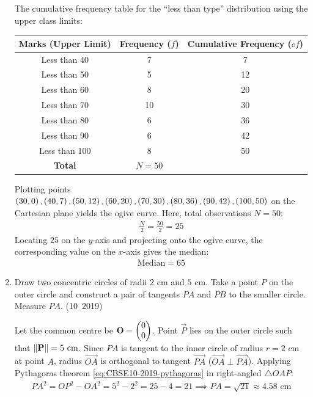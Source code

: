 \begin{enumerate}[label=\thesubsection.\arabic*, ref=\thesubsection.\theenumi]
	\solution
	The cumulative frequency table for the ``less than type'' distribution using the upper class limits:
	\begin{center}
		\begin{tabular}{|c|c|c|}
			\hline
			Marks (Upper Limit) & Frequency ($f$) & Cumulative Frequency ($cf$) \\
			\hline
			Less than 40 & 7 & 7 \\
			Less than 50 & 5 & 12 \\
			Less than 60 & 8 & 20 \\
			Less than 70 & 10 & 30 \\
			Less than 80 & 6 & 36 \\
			Less than 90 & 6 & 42 \\
			Less than 100 & 8 & 50 \\
			\hline
			\textbf{Total} & $N = 50$ & \\
			\hline
		\end{tabular}
	\end{center}
	Plotting points $\brak{30, 0}, \brak{40, 7}, \brak{50, 12}, \brak{60, 20}, \brak{70, 30}, \brak{80, 36}, \brak{90, 42}, \brak{100, 50}$ on the Cartesian plane yields the ogive curve.
	Here, total observations $N = 50$:
	\begin{align}
		\frac{N}{2} = \frac{50}{2} = 25
	\end{align}
	Locating $25$ on the $y$-axis and projecting onto the ogive curve, the corresponding value on the $x$-axis gives the median:
	\begin{align}
		\text{Median} = 65
	\end{align}

	\item Draw two concentric circles of radii $2\text{ cm}$ and $5\text{ cm}$. Take a point $P$ on the outer circle and construct a pair of tangents $PA$ and $PB$ to the smaller circle. Measure $PA$.
	\hfill (10~2019)
	
	\solution
	Let the common centre be $\mathbf{O} = \begin{pmatrix}0 \\ 0\end{pmatrix}$. Point $\vec{P}$ lies on the outer circle such that $\left\lVert\mathbf{P}\right\rVert = 5\text{ cm}$.
	Since $PA$ is tangent to the inner circle of radius $r = 2\text{ cm}$ at point $A$, radius $\vec{OA}$ is orthogonal to tangent $\vec{PA}$ ($\vec{OA} \perp \vec{PA}$).
	Applying Pythagoras theorem \eqref{eq:CBSE10-2019-pythagoras} in right-angled $\triangle OAP$:
	\begin{align}
		PA^2 = OP^2 - OA^2 = 5^2 - 2^2 = 25 - 4 = 21 \implies PA = \sqrt{21} \approx 4.58\text{ cm}
	\end{align}
	

\end{enumerate}
